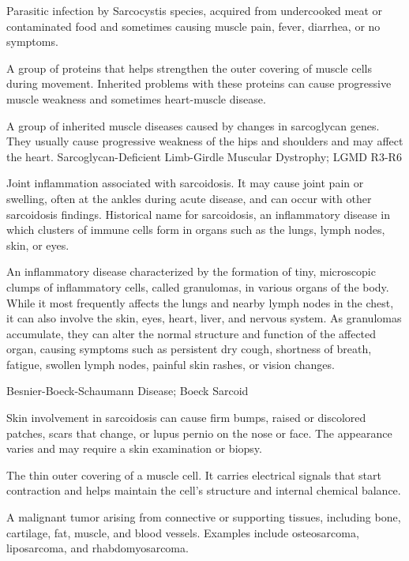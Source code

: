  Parasitic infection by Sarcocystis species, acquired from undercooked meat or contaminated food and sometimes causing muscle pain, fever, diarrhea, or no symptoms.

 A group of proteins that helps strengthen the outer covering of muscle cells during movement. Inherited problems with these proteins can cause progressive muscle weakness and sometimes heart-muscle disease.

 A group of inherited muscle diseases caused by changes in sarcoglycan genes. They usually cause progressive weakness of the hips and shoulders and may affect the heart.
\synonyms
Sarcoglycan-Deficient Limb-Girdle Muscular Dystrophy; LGMD R3-R6

 Joint inflammation associated with sarcoidosis. It may cause joint pain or swelling, often at the ankles during acute disease, and can occur with other sarcoidosis findings.
 Historical name for sarcoidosis, an inflammatory disease in which clusters of immune cells form in organs such as the lungs, lymph nodes, skin, or eyes.

 An inflammatory disease characterized by the formation of tiny, microscopic clumps of inflammatory cells, called granulomas, in various organs of the body. While it most frequently affects the lungs and nearby lymph nodes in the chest, it can also involve the skin, eyes, heart, liver, and nervous system. As granulomas accumulate, they can alter the normal structure and function of the affected organ, causing symptoms such as persistent dry cough, shortness of breath, fatigue, swollen lymph nodes, painful skin rashes, or vision changes.

\synonyms
Besnier-Boeck-Schaumann Disease; Boeck Sarcoid

 Skin involvement in sarcoidosis can cause firm bumps, raised or discolored patches, scars that change, or lupus pernio on the nose or face. The appearance varies and may require a skin examination or biopsy.

 The thin outer covering of a muscle cell. It carries electrical signals that start contraction and helps maintain the cell’s structure and internal chemical balance.

 A malignant tumor arising from connective or supporting tissues, including bone, cartilage, fat,
muscle, and blood vessels. Examples include osteosarcoma, liposarcoma, and rhabdomyosarcoma.


